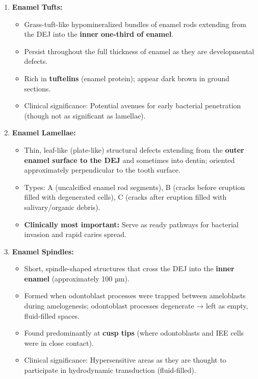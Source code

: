 \documentclass[11pt,a4paper]{article}
\begin{document}
\begin{ansbox}
\begin{enumerate}[leftmargin=*]
    \item \textbf{Enamel Tufts:}
    \begin{itemize}
        \item Grass-tuft-like hypomineralized bundles of enamel rods extending from the DEJ into the \textbf{inner one-third of enamel}.
        \item Persist throughout the full thickness of enamel as they are developmental defects.
        \item Rich in \textbf{tuftelins} (enamel protein); appear dark brown in ground sections.
        \item Clinical significance: Potential avenues for early bacterial penetration (though not as significant as lamellae).
    \end{itemize}
    \item \textbf{Enamel Lamellae:}
    \begin{itemize}
        \item Thin, leaf-like (plate-like) structural defects extending from the \textbf{outer enamel surface to the DEJ} and sometimes into dentin; oriented approximately perpendicular to the tooth surface.
        \item Types: A (uncalcified enamel rod segments), B (cracks before eruption filled with degenerated cells), C (cracks after eruption filled with salivary/organic debris).
        \item \textbf{Clinically most important:} Serve as ready pathways for bacterial invasion and rapid caries spread.
    \end{itemize}
    \item \textbf{Enamel Spindles:}
    \begin{itemize}
        \item Short, spindle-shaped structures that cross the DEJ into the \textbf{inner enamel} (approximately 100 µm).
        \item Formed when odontoblast processes were trapped between ameloblasts during amelogenesis; odontoblast processes degenerate → left as empty, fluid-filled spaces.
        \item Found predominantly at \textbf{cusp tips} (where odontoblasts and IEE cells were in close contact).
        \item Clinical significance: Hypersensitive areas as they are thought to participate in hydrodynamic transduction (fluid-filled).
    \end{itemize}
\end{enumerate}


\end{ansbox}
\end{document}
